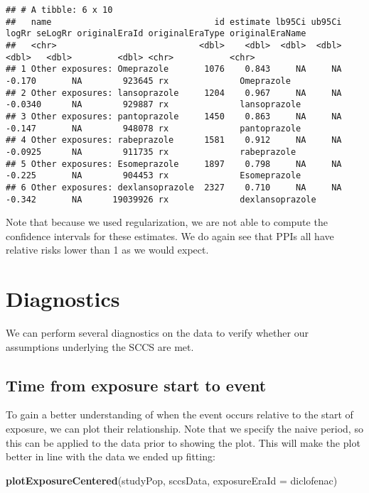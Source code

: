\documentclass[
]{article}
\newenvironment{Shaded}{\begin{snugshade}}{\end{snugshade}}
\newcommand{\DataTypeTok}[1]{\textcolor[rgb]{0.13,0.29,0.53}{#1}}
\newcommand{\KeywordTok}[1]{\textcolor[rgb]{0.13,0.29,0.53}{\textbf{#1}}}
\newcommand{\NormalTok}[1]{#1}
\begin{document}
\begin{verbatim}
## # A tibble: 6 x 10
##   name                                id estimate lb95Ci ub95Ci   logRr seLogRr originalEraId originalEraType originalEraName
##   <chr>                            <dbl>    <dbl>  <dbl>  <dbl>   <dbl>   <dbl>         <dbl> <chr>           <chr>          
## 1 Other exposures: Omeprazole       1076    0.843     NA     NA -0.170       NA        923645 rx              Omeprazole     
## 2 Other exposures: lansoprazole     1204    0.967     NA     NA -0.0340      NA        929887 rx              lansoprazole   
## 3 Other exposures: pantoprazole     1450    0.863     NA     NA -0.147       NA        948078 rx              pantoprazole   
## 4 Other exposures: rabeprazole      1581    0.912     NA     NA -0.0925      NA        911735 rx              rabeprazole    
## 5 Other exposures: Esomeprazole     1897    0.798     NA     NA -0.225       NA        904453 rx              Esomeprazole   
## 6 Other exposures: dexlansoprazole  2327    0.710     NA     NA -0.342       NA      19039926 rx              dexlansoprazole
\end{verbatim}

Note that because we used regularization, we are not able to compute the
confidence intervals for these estimates. We do again see that PPIs all
have relative risks lower than 1 as we would expect.

\hypertarget{diagnostics}{%
\section{Diagnostics}\label{diagnostics}}

We can perform several diagnostics on the data to verify whether our
assumptions underlying the SCCS are met.

\hypertarget{time-from-exposure-start-to-event}{%
\subsection{Time from exposure start to
event}\label{time-from-exposure-start-to-event}}

To gain a better understanding of when the event occurs relative to the
start of exposure, we can plot their relationship. Note that we specify
the naive period, so this can be applied to the data prior to showing
the plot. This will make the plot better in line with the data we ended
up fitting:

\begin{Shaded}
\begin{Highlighting}[]
\KeywordTok{plotExposureCentered}\NormalTok{(studyPop, sccsData, }\DataTypeTok{exposureEraId =}\NormalTok{ diclofenac)}
\end{Highlighting}
\end{Shaded}
\end{document}
